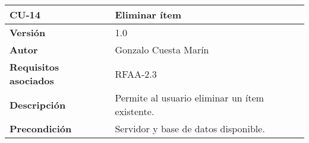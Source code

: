 \begin{longtable}[]{@{}ll@{}}
\toprule
\begin{minipage}[b]{0.20\columnwidth}\raggedright
\textbf{CU-14}\strut
\end{minipage} & \begin{minipage}[b]{0.74\columnwidth}\raggedright
\textbf{Eliminar ítem}\strut
\end{minipage}\tabularnewline
\midrule
\endhead
\begin{minipage}[t]{0.20\columnwidth}\raggedright
\textbf{Versión}\strut
\end{minipage} & \begin{minipage}[t]{0.74\columnwidth}\raggedright
1.0\strut
\end{minipage}\tabularnewline
\begin{minipage}[t]{0.20\columnwidth}\raggedright
\textbf{Autor}\strut
\end{minipage} & \begin{minipage}[t]{0.74\columnwidth}\raggedright
Gonzalo Cuesta Marín\strut
\end{minipage}\tabularnewline
\begin{minipage}[t]{0.20\columnwidth}\raggedright
\textbf{Requisitos asociados}\strut
\end{minipage} & \begin{minipage}[t]{0.74\columnwidth}\raggedright
RFAA-2.3\strut
\end{minipage}\tabularnewline
\begin{minipage}[t]{0.20\columnwidth}\raggedright
\textbf{Descripción}\strut
\end{minipage} & \begin{minipage}[t]{0.74\columnwidth}\raggedright
Permite al usuario eliminar un ítem existente.\strut
\end{minipage}\tabularnewline
\begin{minipage}[t]{0.20\columnwidth}\raggedright
\textbf{Precondición}\strut
\end{minipage} & \begin{minipage}[t]{0.74\columnwidth}\raggedright
Servidor y base de datos disponible.


\end{minipage}
\end{longtable}
